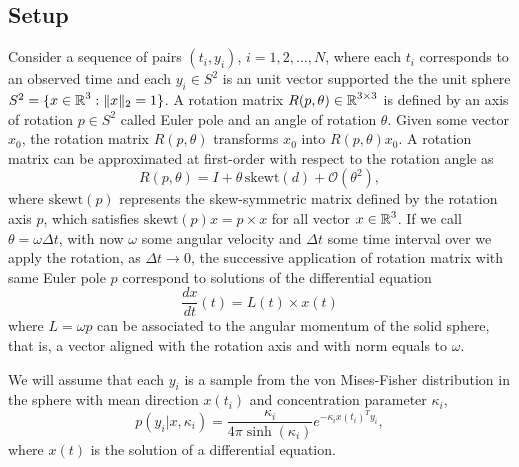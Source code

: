 \subsection{Setup}

Consider a sequence of pairs $(t_i, y_i)$, $i=1, 2, \ldots, N$, where each $t_i$ corresponds to an observed time and each $y_i \in S^2$ is an unit vector supported the the unit sphere $S^2 = \{ x \in \operatorname{\mathbb{R}}^3 : \| x \|_2 = 1 \}$. 
A rotation matrix $R(p, \theta) \in \operatorname{\mathbb{R}}^{3 \times 3}$ is defined by an axis of rotation $p \in S^2$ called Euler pole and an angle of rotation $\theta$.
Given some vector $x_0$, the rotation matrix $R(p, \theta)$ transforms $x_0$ into $R(p, \theta) x_0$.
A rotation matrix can be approximated at first-order with respect to the rotation angle as
\begin{equation}
    R(p, \theta) 
    = 
    I + \theta \, \text{skewt}(d) + \mathcal O (\theta^2 ),
\end{equation}
where $ \text{skewt}(p)$ represents the skew-symmetric matrix defined by the rotation axis $p$, which satisfies $\text{skewt}(p)  x =p \times x$ for all vector $x \in \operatorname{\mathbb{R}}^3$. 
If we call $\theta = \omega \Delta t$, with now $\omega$ some angular velocity and $\Delta t$ some time interval over we apply the rotation, as $\Delta t \rightarrow 0$, the successive application of rotation matrix with same Euler pole $p$ correspond to solutions of the differential equation 
\begin{equation}
    \frac{dx}{dt} (t)
    = 
    L(t) \times x(t) %
    \label{eq:sphere-ode}
\end{equation}
where $L = \omega p$ can be associated to the angular momentum of the solid sphere, that is, a vector aligned with the rotation axis and with norm equals to $\omega$. 

We will assume that each $y_i$ is a sample from the von Mises-Fisher distribution \cite{fisher1953dispersion, Watson_1982} in the sphere with mean direction $x(t_i)$ and concentration parameter $\kappa_i$, 
\begin{equation}
    p(y_i | x, \kappa_i)
    = 
    \frac{\kappa_i}{4 \pi \sinh (\kappa_i)} e^{- \kappa_i x(t_i)^T y_i},
\end{equation}
where $x(t)$ is the solution of a differential equation. 



